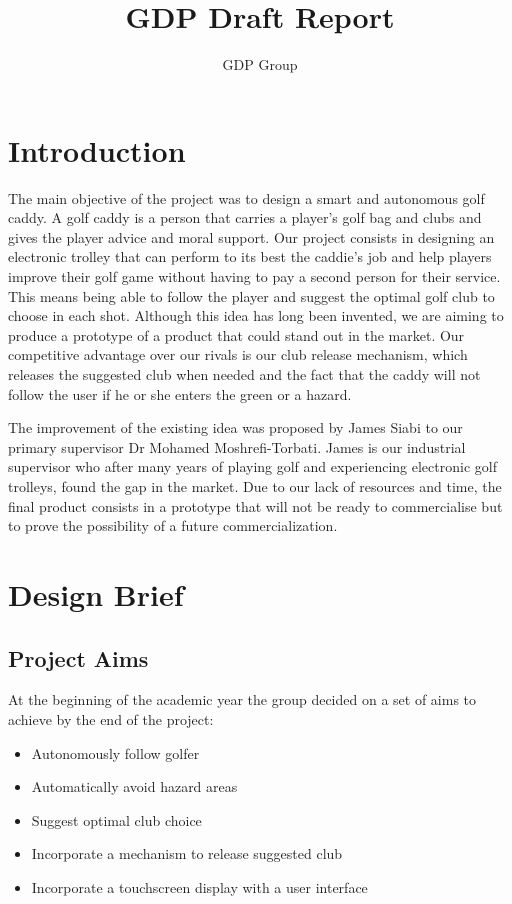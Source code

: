 \documentclass[11pt,landscape]{article}
\title{GDP Draft Report}
\author{GDP Group}
\begin{document}
\maketitle
\newpage
\begin{multicols}{3}
\tableofcontents
\newpage
\section{Introduction}
The main objective of the project was to design a smart and autonomous golf
caddy. A golf caddy is a person that carries a player’s golf bag and clubs and
gives the player advice and moral support. Our project consists in designing an
electronic trolley that can perform to its best the caddie’s job and help
players improve their golf game without having to pay a second person for their
service. This means being able to follow the player and suggest the optimal golf
club to choose in each shot. Although this idea has long been invented, we are
aiming to produce a prototype of a product that could stand out in the market.
Our competitive advantage over our rivals is our club release mechanism, which
releases the suggested club when needed and the fact that the caddy will not
follow the user if he or she enters the green or a hazard.

The improvement of the existing idea was proposed by James Siabi to our primary
supervisor Dr Mohamed Moshrefi-Torbati. James is our industrial supervisor who
after many years of playing golf and experiencing electronic golf trolleys,
found the gap in the market. Due to our lack of resources and time, the final
product consists in a prototype that will not be ready to commercialise but to
prove the possibility of a future commercialization.

\section{Design Brief}
\subsection{Project Aims}
At the beginning of the academic year the group decided on a set of aims to
achieve by the end of the project:

\begin{itemize}
    \item   Autonomously follow golfer
    \item   Automatically avoid hazard areas 
    \item   Suggest optimal club choice
    \item   Incorporate a mechanism to release suggested club
    \item   Incorporate a touchscreen display with a user interface
\end{itemize}


\end{multicols}
\end{document}
